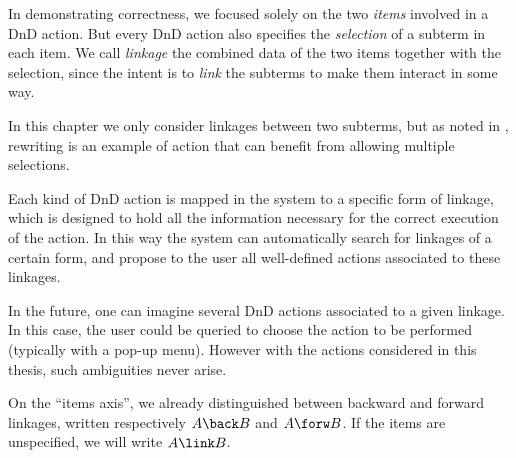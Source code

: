 In demonstrating correctness, we focused solely on the two \emph{items} involved
in a DnD action. But every DnD action also specifies the \emph{selection} of a
subterm in each item. We call \emph{linkage} the combined data of the two items
together with the selection, since the intent is to \emph{link} the subterms
to make them interact in some way.

\begin{remark}
In this chapter we only consider linkages between two subterms, but as noted in
, rewriting is an example of action that can benefit from
allowing multiple selections.
\end{remark}

Each kind of DnD action is mapped in the system to a specific form of linkage,
which is designed to hold all the information necessary for the correct
execution of the action. In this way the system can automatically search for
linkages of a certain form, and propose to the user all well-defined actions
associated to these linkages.

\begin{remark}
  In the future, one can imagine several DnD actions associated to a given
  linkage. In this case, the user could be queried to choose the action to be
  performed (typically with a pop-up menu). However with the actions considered
  in this thesis, such ambiguities never arise.
\end{remark}

On the ``items axis'', we already distinguished between backward and forward
linkages, written respectively $A \back B$ and $A \forw B$. If the items are
unspecified, we will write $A \link B$.

